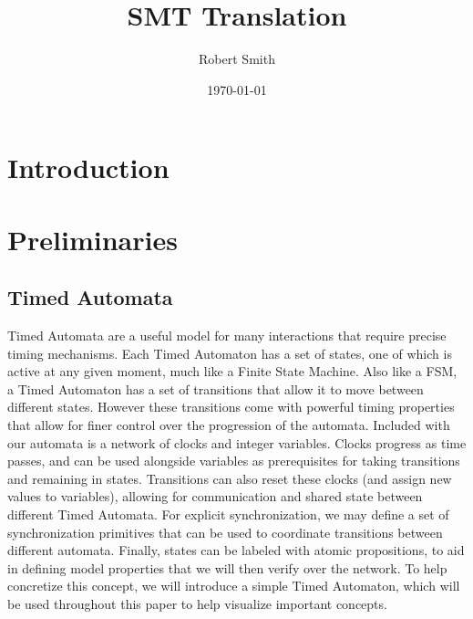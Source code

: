 \documentclass[a4paper,12pt]{article}
\author{Robert Smith}
\date{\today}
\title{SMT Translation}
\begin{document}
\maketitle
\tableofcontents

\section{Introduction}\label{introduction}

\section{Preliminaries}\label{prelims}
\subsection{Timed Automata}\label{timed-automata}

Timed Automata are a useful model for many interactions that require precise
timing mechanisms. Each Timed Automaton has a set of states, one of which is
active at any given moment, much like a Finite State Machine. Also like a FSM, a
Timed Automaton has a set of transitions that allow it to move between different
states. However these transitions come with powerful timing properties that
allow for finer control over the progression of the automata. Included with our
automata is a network of clocks and integer variables. Clocks progress as time
passes, and can be used alongside variables as prerequisites for taking
transitions and remaining in states. Transitions can also reset these clocks
(and assign new values to variables), allowing for communication and shared
state between different Timed Automata. For explicit synchronization, we may
define a set of synchronization primitives that can be used to coordinate
transitions between different automata. Finally, states can be labeled with
atomic propositions, to aid in defining model properties that we will then
verify over the network. To help concretize this concept, we will introduce a
simple Timed Automaton, which will be used throughout this paper to help
visualize important concepts.
\end{document}
